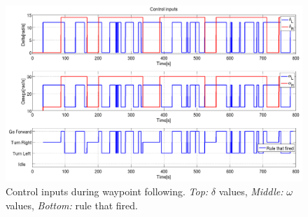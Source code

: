 \begin{figure}
\centering
\includegraphics[width=\textwidth]{Files/Figures/wp_2015-10-29_18-42-34-control-inputs.png}
\caption[Control inputs during waypoint following]{Control inputs during waypoint following. \textit{Top:} $\delta$ values, \textit{Middle:} $\omega$ values, \textit{Bottom:} rule that fired.}
\label{fig:wp_control_inputs}
\end{figure}

